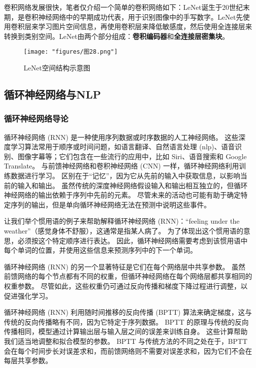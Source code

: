 卷积网络发展很快，笔者仅介绍一个简单的卷积网络如下：LeNet诞生于20世纪末期，是卷积神经网络中的早期成功代表，用于识别图像中的手写数字。LeNet先使用卷积层来学习图片空间信息，再使用卷积层来降低敏感度，然后使用全连接层来转换到类别空间。LeNet由两个部分组成：\textbf{卷积编码器}和\textbf{全连接层密集块}。

\begin{figure}[ht] %
	\centering
	\texttt{[image: "figures/图28.png"]} %
	\caption{LeNet空间结构示意图} %
	\label{fig:example} %
\end{figure}

\subsection{循环神经网络与NLP}
\subsubsection{循环神经网络导论}
循环神经网络 (RNN) 是一种使用序列数据或时序数据的人工神经网络。 这些深度学习算法常用于顺序或时间问题，如语言翻译、自然语言处理 (nlp)、语音识别、图像字幕等；它们包含在一些流行的应用中，比如 Siri、语音搜索和 Google Translate。 与前馈神经网络和卷积神经网络 (CNN) 一样，循环神经网络利用训练数据进行学习。 区别在于“记忆”，因为它从先前的输入中获取信息，以影响当前的输入和输出。 虽然传统的深度神经网络假设输入和输出相互独立的，但循环神经网络的输出依赖于序列中先前的元素。 尽管未来的活动也可能有助于确定特定序列的输出，但是单向循环神经网络无法在预测中说明这些事件。

让我们举个惯用语的例子来帮助解释循环神经网络 (RNN)：“feeling under the weather”（感觉身体不舒服），这通常是指某人病了。 为了体现出这个惯用语的意思，必须按这个特定顺序进行表达。 因此，循环神经网络需要考虑到该惯用语中每个单词的位置，并使用这些信息来预测序列中的下一个单词。

循环神经网络 (RNN) 的另一个显著特征是它们在每个网络层中共享参数。 虽然前馈网络的每个节点都有不同的权重，但循环神经网络在每个网络层都共享相同的权重参数。 尽管如此，这些权重仍可通过反向传播和梯度下降过程进行调整，以促进强化学习。

循环神经网络 (RNN) 利用随时间推移的反向传播 (BPTT) 算法来确定梯度，这与传统的反向传播略有不同，因为它特定于序列数据。 BPTT 的原理与传统的反向传播相同，模型通过计算输出层与输入层之间的误差来训练自身。 这些计算帮助我们适当地调整和拟合模型的参数。 BPTT 与传统方法的不同之处在于，BPTT 会在每个时间步长对误差求和，而前馈网络则不需要对误差求和，因为它们不会在每层共享参数。

